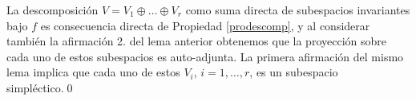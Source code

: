 \dem La descomposici\'on $V=V_1\oplus\ldots\oplus V_r$ como suma directa de subespacios invariantes bajo $f$ es consecuencia directa de Propiedad \ref{prodescomp}, y al considerar tambi\'en la afirmaci\'on 2. del lema anterior obtenemos que la proyecci\'on sobre cada uno de estos subespacios es auto-adjunta. La primera afirmaci\'on del mismo lema implica que cada uno de estos $V_i$, $i=1,\ldots,r$, es un subespacio simpl\'ectico.\qed

